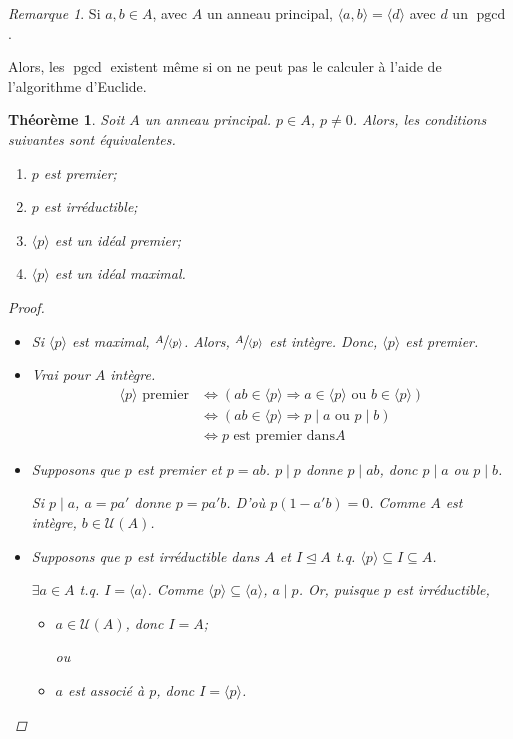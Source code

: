 \documentclass{report}
\newtheorem*{thm}{Th\'eor\`eme}
\theoremstyle{definition}
\theoremstyle{remark}
\newtheorem*{rmq}{Remarque}
\def\pgcd{\operatorname{pgcd}}
\begin{document}
	\begin{rmq}
		Si $a,b\in A$, avec $A$ un anneau principal, $\langle a,b \rangle = \langle d \rangle$ avec $d$ un $\pgcd$.

		Alors, les $\pgcd$ existent m\^eme si on ne peut pas le calculer \`a l'aide de l'algorithme d'Euclide.
	\end{rmq}

	\begin{thm}
		Soit $A$ un anneau principal. $p\in A$, $p\neq0$. Alors, les conditions suivantes sont \'equivalentes.
		\begin{enumerate}
			\item $p$ est premier;
			\item $p$ est irr\'eductible;
			\item $\langle p \rangle$ est un id\'eal premier;
			\item $\langle p \rangle$ est un id\'eal maximal.
		\end{enumerate}
		\begin{proof}
			\begin{itemize}
				\item[4$\Rightarrow$3] Si $\langle p \rangle$ est maximal, $\sfrac{A}{\langle p \rangle}$. Alors, $\sfrac{A}{\langle p \rangle}$ est int\`egre. Donc, $\langle p \rangle$ est premier.
				\item[3$\Leftrightarrow$1] Vrai pour $A$ int\`egre.
				\begin{align*}
					\langle p \rangle \text{ premier}&\Longleftrightarrow \left( ab\in\langle p \rangle \Longrightarrow a\in\langle p \rangle \text{ ou } b\in\langle p \rangle \right)\\
					&\Longleftrightarrow \left( ab\in\langle p\rangle \Longrightarrow p \mid a \text{ ou } p \mid b \right)\\
					&\Longleftrightarrow p \text{ est premier dans} A
				\end{align*}
				\item[1$\Rightarrow$2] Supposons que $p$ est premier et $p=ab$. $p\mid p$ donne $p\mid ab$, donc $p\mid a$ ou $p\mid b$.

				Si $p\mid a$, $a=pa'$ donne $p=pa'b$. D'o\`u $p(1-a'b)=0$. Comme $A$ est int\`egre, $b\in\mathcal{U}(A)$.
				\item[2$\Rightarrow$4] Supposons que $p$ est irr\'eductible dans $A$ et $I\trianglelefteq A$ t.q. $\langle p \rangle\subseteq I\subseteq A$.

				$\exists a\in A$ t.q. $I=\langle a \rangle$. Comme $\langle p \rangle\subseteq\langle a \rangle$, $a\mid p$. Or, puisque $p$ est irr\'eductible,
				\begin{itemize}[nosep]
					\item $a\in\mathcal{U}(A)$, donc $I=A$;

					ou
					\item $a$ est associ\'e \`a $p$, donc $I=\langle p\rangle$.
				\end{itemize}
			\end{itemize}
		\end{proof}
	\end{thm}
\end{document}
